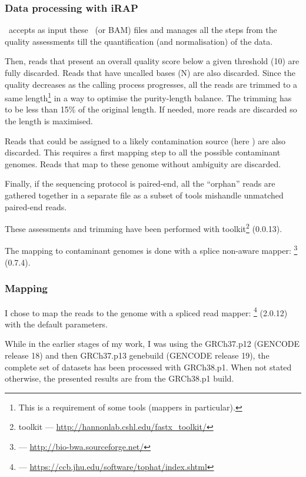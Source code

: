 \subsubsection{Data processing with iRAP}

\irap\ accepts as input these \fastq\ (or \gls{BAM}) files and manages all
the steps from the quality assessments till the quantification (and
normalisation) of the data.



Then, reads that present an overall quality score below a given threshold (10) are
fully discarded. Reads that have uncalled bases (\textsc{N}) are also discarded.
Since the quality decreases as the calling process progresses, all the reads are
trimmed to a same length\footnote{This is a requirement of some tools (mappers
in particular).} in a way to optimise the purity-length balance. The trimming has
to be less than 15\% of the original length. If needed, more reads are discarded
so the length is maximised.

Reads that could be assigned to a likely contamination source (here
) are also discarded. This requires a first mapping
step to all the possible contaminant genomes. Reads that map to these genome
without ambiguity are discarded.

Finally, if the sequencing protocol is paired-end, all the ``orphan'' reads are
gathered together in a separate file as a subset of tools mishandle unmatched
paired-end reads.

These assessments and trimming have been performed with 
toolkit\footnote{ toolkit ---
\href{http://hannonlab.cshl.edu/fastx\_toolkit/}%
{http://hannonlab.cshl.edu/fastx\_toolkit/}} (0.0.13).

The mapping to contaminant genomes is done with a splice non-aware mapper:
\footnote{ --- \href{http://bio-bwa.sourceforge.net/}%
{http://bio-bwa.sourceforge.net/}} (0.7.4).

\subsubsection{Mapping}
I chose to map the reads to the  genome with a spliced
read mapper: \footnote{ ---
\href{https://ccb.jhu.edu/software/tophat/index.shtml}%
{https://ccb.jhu.edu/software/tophat/index.shtml}} (2.0.12) with the default
parameters.

While in the earlier stages of my work, I was using the GRCh37.p12
(GENCODE release 18) and then GRCh37.p13 genebuild (GENCODE release 19),
the complete set of datasets has been processed with GRCh38.p1.
When not stated otherwise, the presented results are from the GRCh38.p1 build.

